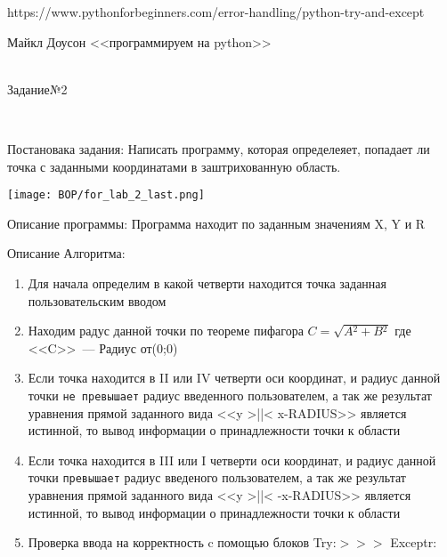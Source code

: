 \documentclass[a4paper]{article}
\begin{document}
    \begin{thebibliography}{}
        https://www.pythonforbeginners.com/error-handling/python-try-and-except
        \item Майкл Доусон <<программируем на python>>
    \end{thebibliography}
\hfill\break

\begin{center}\underline{\hspace{5cm}}\\Задание№2\end{center}
\\
    \begin{lab2.2}
        Постановака задания: Написать программу, которая определеяет, попадает ли точка с заданными координатами в заштрихованную область.
    \begin{introduction}
        \begin{center}
            \texttt{[image: BOP/for\_lab\_2\_last.png]}
        \end{center}
    \end{introduction}
    \begin{description}
        Описание программы:
        Программа находит по заданным значениям X, Y и R
    \end{description}
    \begin{algoritm}
        Описание Алгоритма:
        \small\begin{enumerate}
            \item Для начала определим в какой четверти находится точка заданная пользовательским вводом 
            \item Находим радус данной точки по теореме пифагора $C=\sqrt{A{^2}+B{^2}}$ где <<C>>~--- Радиус от(0;0)
            \item Если точка находится в II или IV четверти оси координат, и радиус данной точки \texttt{не превышает} радиус введенного пользователем, а так же результат уравнения прямой заданного вида <<y >||< x-RADIUS>> является истинной, то вывод информации о принадлежности точки к области
            \item Если точка находится в III или I четверти оси координат, и радиус данной точки \texttt{превышает} радиус введеного пользователем, а так же результат уравнения прямой заданного вида <<y >||< -x-RADIUS>> является истинной, то вывод информации о принадлежности точки к области
            \item Проверка ввода на корректность c помощью блоков Try:$>>>$ Exceptr:

\end{enumerate}
\end{algoritm}
\end{lab2.2}
\end{document}
